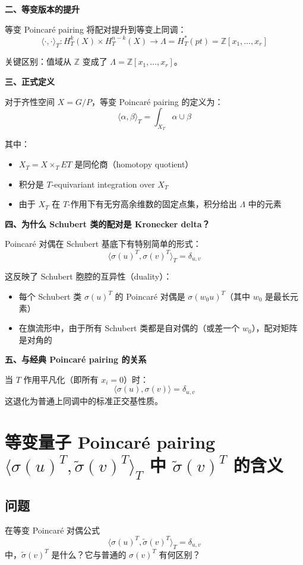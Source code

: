 \textbf{二、等变版本的提升}

等变 Poincaré pairing 将配对提升到等变上同调：
$$\langle \cdot, \cdot \rangle_T: H_T^k(X) \times H_T^{n-k}(X) \to \Lambda = H_T^*(pt) = \mathbb{Z}[x_1, \ldots, x_r]$$

关键区别：值域从 $\mathbb{Z}$ 变成了 $\Lambda = \mathbb{Z}[x_1, \ldots, x_r]$。

\textbf{三、正式定义}

对于齐性空间 $X = G/P$，等变 Poincaré pairing 的定义为：
$$\langle \alpha, \beta \rangle_T = \int_{X_T} \alpha \cup \beta$$

其中：
\begin{itemize}
\item $X_T = X \times_T ET$ 是同伦商（homotopy quotient）
\item 积分是 $T$-equivariant integration over $X_T$
\item 由于 $X_T$ 在 $T$-作用下有无穷高余维数的固定点集，积分给出 $\Lambda$ 中的元素
\end{itemize}

\textbf{四、为什么 Schubert 类的配对是 Kronecker delta？}

Poincaré 对偶在 Schubert 基底下有特别简单的形式：
$$\langle \sigma(u)^T, \sigma(v)^T \rangle_T = \delta_{u,v}$$

这反映了 Schubert 胞腔的互异性（duality）：
\begin{itemize}
\item 每个 Schubert 类 $\sigma(u)^T$ 的 Poincaré 对偶是 $\sigma(w_0 u)^T$（其中 $w_0$ 是最长元素）
\item 在旗流形中，由于所有 Schubert 类都是自对偶的（或差一个 $w_0$），配对矩阵是对角的
\end{itemize}

\textbf{五、与经典 Poincaré pairing 的关系}

当 $T$ 作用平凡化（即所有 $x_i = 0$）时：
$$\langle \sigma(u), \sigma(v) \rangle = \delta_{u,v}$$
这退化为普通上同调中的标准正交基性质。

\section{等变量子 Poincaré pairing $\langle \sigma(u)^T, \widetilde{\sigma}(v)^T \rangle_T$ 中 $\widetilde{\sigma}(v)^T$ 的含义}\label{sec:qa-tilde-sigma-definition}
\subsection{问题}
在等变 Poincaré 对偶公式
$$\langle \sigma(u)^T, \widetilde{\sigma}(v)^T \rangle_T = \delta_{u,v}$$
中，$\widetilde{\sigma}(v)^T$ 是什么？它与普通的 $\sigma(v)^T$ 有何区别？
